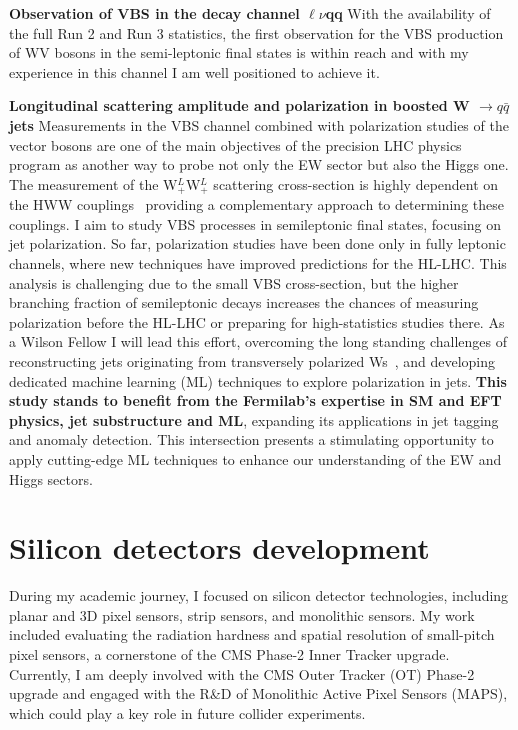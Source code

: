 {\begin{flushleft}
\textbf{Observation of VBS in the decay channel $\ell\nu$qq} With the availability of the full Run 2 and Run 3 statistics, the first observation for the VBS production of WV bosons in the semi-leptonic final states is within reach and with my experience in this channel I am well positioned to achieve it.

\textbf{Longitudinal scattering amplitude and polarization in boosted W $\to q\bar{q}$ jets}
Measurements in the VBS channel combined with polarization studies of the vector bosons are one of the main objectives of the precision LHC physics program as another way to probe not only the EW sector but also the Higgs one.
The measurement of the  W$^L_+$W$^L_+$ scattering cross-section is highly dependent on the HWW couplings~\cite{[3]} providing a complementary approach to determining these couplings.
I aim to study VBS processes in semileptonic final states, focusing on jet polarization. So far, polarization studies have been done only in fully leptonic channels, where new techniques have improved predictions for the HL-LHC. This analysis is challenging due to the small VBS cross-section, but the higher branching fraction of semileptonic decays increases the chances of measuring polarization before the HL-LHC or preparing for high-statistics studies there. As a Wilson Fellow I will lead this effort, overcoming the long standing challenges of reconstructing jets originating from transversely polarized Ws~\cite{[4]}, and developing dedicated machine learning (ML) techniques to explore polarization in jets.
\textbf{This study stands to benefit from the Fermilab’s expertise in SM and EFT physics, jet substructure and ML}, expanding its applications in jet tagging and anomaly detection. This intersection presents a stimulating opportunity to apply cutting-edge ML techniques to enhance our understanding of the EW and Higgs sectors.


 
\vskip 5pt
\section{Silicon detectors development}
\vskip 5pt
During my academic journey, I focused on silicon detector technologies, including planar and 3D pixel sensors, strip sensors, and monolithic sensors. My work included evaluating the radiation hardness and spatial resolution of small-pitch pixel sensors, a cornerstone of the CMS Phase-2 Inner Tracker upgrade. Currently, I am deeply involved with the CMS Outer Tracker  (OT) Phase-2 upgrade and engaged with the R\&D of Monolithic Active Pixel Sensors (MAPS), which could play a key role in future collider experiments.
\vskip 5pt 

\end{flushleft}}
